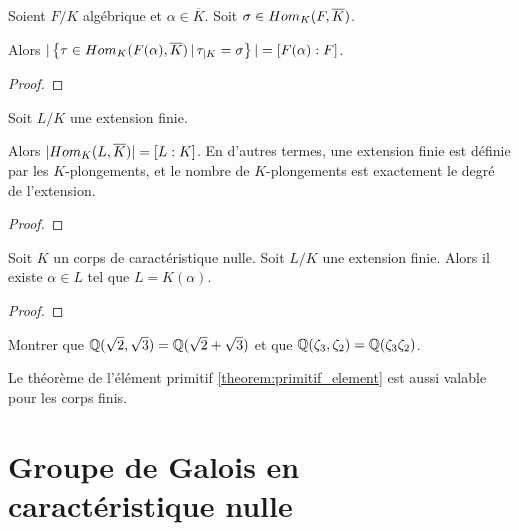 \begin{corollary}
	Soient $F/K$ algébrique et $\alpha \in \overline{K}$.
	Soit $\sigma \in Hom_{K}(F, \overline{K})$.

	Alors $|\left\{\tau \in Hom_{K}(F(\alpha), \overline{K}) \, | \, \tau_{|K} =
\sigma \right\}| = [F(\alpha) : F]$.
\end{corollary}

\ifdefined\outputproof
\begin{proof}

\end{proof}
\fi

\begin{proposition}
	\label{prop:k-plongement_degree_extension}
	Soit $L/K$ une extension finie.

	Alors $|Hom_{K}(L, \overline{K})| = [L : K]$.
	En d'autres termes, une extension finie est définie par les $K$-plongements,
	et le nombre de $K$-plongements est exactement le degré de l'extension.
\end{proposition}

\ifdefined\outputproof
\begin{proof}

\end{proof}
\fi



\begin{theorem} 
	\label{theorem:primitif_element}
	Soit $K$ un corps de caractéristique nulle.
	Soit $L/K$ une extension finie. Alors il existe $\alpha \in L$ tel que $L =
	K(\alpha)$.
\end{theorem}

\ifdefined\outputproof
\begin{proof}

\end{proof}
\fi

\begin{exercice}
	Montrer que $\mathbb{Q}(\sqrt{2}, \sqrt{3}) = \mathbb{Q}(\sqrt{2} + \sqrt{3})$
	et que $\mathbb{Q}(\zeta_{3}, \zeta_{2}) = \mathbb{Q}(\zeta_{3} \zeta_{2})$.
\end{exercice}

\begin{remarque}
	Le théorème de l'élément primitif \ref{theorem:primitif_element} est aussi
	valable pour les corps finis.
\end{remarque}

\section{Groupe de Galois en caractéristique nulle}

